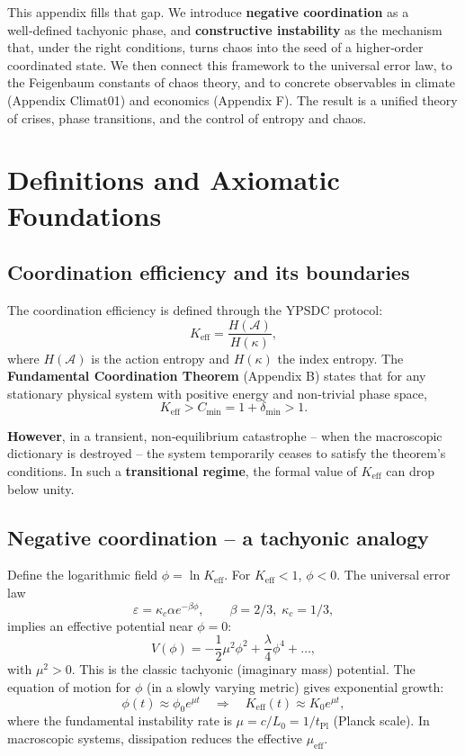 \documentclass[12pt,a4paper]{article}
\newcommand{\Keff}{K_{\mathrm{eff}}}
\begin{document}
	This appendix fills that gap. We introduce \textbf{negative coordination} as a
	well‑defined tachyonic phase, and \textbf{constructive instability} as the mechanism
	that, under the right conditions, turns chaos into the seed of a higher‑order
	coordinated state. We then connect this framework to the universal error law, to
	the Feigenbaum constants of chaos theory, and to concrete observables in climate
	(Appendix Climat01) and economics (Appendix F). The result is a unified theory of
	crises, phase transitions, and the control of entropy and chaos.
	
	\section{Definitions and Axiomatic Foundations}
	
	\subsection{Coordination efficiency and its boundaries}
	
	The coordination efficiency is defined through the YPSDC protocol:
	\[
	\Keff = \frac{H(\mathcal{A})}{H(\kappa)},
	\]
	where $H(\mathcal{A})$ is the action entropy and $H(\kappa)$ the index entropy.
	The \textbf{Fundamental Coordination Theorem} (Appendix B) states that for any
	stationary physical system with positive energy and non‑trivial phase space,
	\[
	\Keff > C_{\min} = 1 + \delta_{\min} > 1.
	\]
	
	\textbf{However}, in a transient, non‑equilibrium catastrophe – when the macroscopic
	dictionary is destroyed – the system temporarily ceases to satisfy the theorem’s
	conditions. In such a \textbf{transitional regime}, the formal value of $\Keff$ can
	drop below unity.
	
	\subsection{Negative coordination – a tachyonic analogy}
	
	Define the logarithmic field $\phi = \ln \Keff$. For $\Keff < 1$, $\phi < 0$.
	The universal error law
	\[
	\varepsilon = \kappa_c \alpha e^{-\beta \phi}, \qquad \beta = 2/3,\; \kappa_c = 1/3,
	\]
	implies an effective potential near $\phi = 0$:
	\[
	V(\phi) = -\frac{1}{2}\mu^2 \phi^2 + \frac{\lambda}{4}\phi^4 + \dots,
	\]
	with $\mu^2 > 0$. This is the classic tachyonic (imaginary mass) potential.
	The equation of motion for $\phi$ (in a slowly varying metric) gives exponential growth:
	\[
	\phi(t) \approx \phi_0 e^{\mu t} \quad\Longrightarrow\quad \Keff(t) \approx K_0 e^{\mu t},
	\]
	where the fundamental instability rate is $\mu = c/L_0 = 1/t_{\mathrm{Pl}}$ (Planck scale).
	In macroscopic systems, dissipation reduces the effective $\mu_{\mathrm{eff}}$.
	
\end{document}
